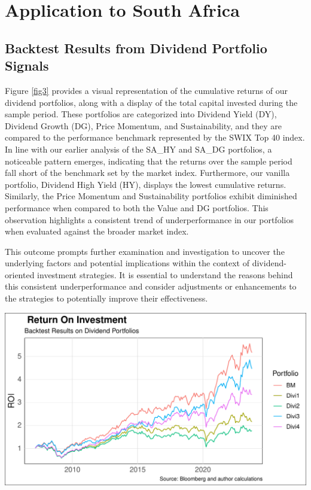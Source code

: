 \documentclass[11pt,preprint, authoryear]{elsarticle}
\let\origfigure\figure
\let\endorigfigure\endfigure
\renewenvironment{figure}[1][2] {
    \expandafter\origfigure\expandafter[H]
} {
    \endorigfigure
}
\numberwithin{equation}{section}
\numberwithin{figure}{section}
\numberwithin{table}{section}
\begin{document}
\hypertarget{application-to-south-africa}{%
\section*{Application to South
Africa}\label{application-to-south-africa}}

\hypertarget{backtest-results-from-dividend-portfolio-signals}{%
\subsection*{Backtest Results from Dividend Portfolio
Signals}\label{backtest-results-from-dividend-portfolio-signals}}

Figure \ref{fig3} provides a visual representation of the cumulative
returns of our dividend portfolios, along with a display of the total
capital invested during the sample period. These portfolios are
categorized into Dividend Yield (DY), Dividend Growth (DG), Price
Momentum, and Sustainability, and they are compared to the performance
benchmark represented by the SWIX Top 40 index. In line with our earlier
analysis of the SA\_HY and SA\_DG portfolios, a noticeable pattern
emerges, indicating that the returns over the sample period fall short
of the benchmark set by the market index. Furthermore, our vanilla
portfolio, Dividend High Yield (HY), displays the lowest cumulative
returns. Similarly, the Price Momentum and Sustainability portfolios
exhibit diminished performance when compared to both the Value and DG
portfolios. This observation highlights a consistent trend of
underperformance in our portfolios when evaluated against the broader
market index.

This outcome prompts further examination and investigation to uncover
the underlying factors and potential implications within the context of
dividend-oriented investment strategies. It is essential to understand
the reasons behind this consistent underperformance and consider
adjustments or enhancements to the strategies to potentially improve
their effectiveness.

\begin{figure}[H]

\includegraphics{Much_Ado_About_Dividends_files/figure-latex/Figure3-1} \hfill{}

\caption{Rolling 3 Year Returns \label{fig3}}\label{fig:Figure3}
\end{figure}
\end{document}
